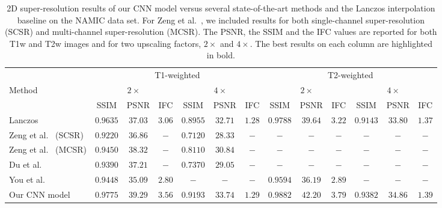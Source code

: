 \documentclass{ieeeaccess}
\begin{document}
\begin{table*}[!t]
\caption{2D super-resolution results of our CNN model versus several state-of-the-art methods \cite{Du-AS-2019,You-TMI-2019,ZENG-CBM-2018} and the Lanczos interpolation baseline on the NAMIC data set. For Zeng et al.~\cite{ZENG-CBM-2018}, we included results for both single-channel super-resolution (SCSR) and multi-channel super-resolution (MCSR). The PSNR, the SSIM and the IFC values are reported for both T1w and T2w images and for two upscaling factors, $2\times$ and $4\times$. The best results on each column are highlighted in bold.}\label{tab_namic_results_2D}
\begin{center}
\begin{tabular}{|l|c|c|c|c|c|c|c|c|c|c|c|c|}
\hline 
  & \multicolumn{6}{|c|}{T1-weighted} & \multicolumn{6}{|c|}{T2-weighted}\\
\cline{2-13}
Method        							& \multicolumn{3}{|c|}{$2\times$} & \multicolumn{3}{|c|}{$4\times$} & \multicolumn{3}{|c|}{$2\times$} & \multicolumn{3}{|c|}{$4\times$}\\
\cline{2-13}   												& SSIM         & PSNR      & IFC			& SSIM        & PSNR & IFC    & SSIM           & PSNR & IFC          & SSIM           & PSNR & IFC\\
\hline  
\hline   
Lanczos														& $0.9635$ & $37.03$ & $3.06$ & $0.8955$ & $32.71$  & $1.28$ & $0.9788$ & $39.64$ & $3.22$ & $0.9143$ & $33.80$ & $1.37$\\
\hline
Zeng et al.~\cite{ZENG-CBM-2018} (SCSR)	& $0.9220$ & $36.86$ & $-$ & $0.7120$ & $28.33$ & $-$ & $-$  & $-$ & $-$  & $-$ & $-$  & $-$\\  
\hline 
Zeng et al.~\cite{ZENG-CBM-2018} (MCSR)	& $0.9450$ & $38.32$ & $-$ & $0.8110$ & $30.84$ & $-$ & $-$  & $-$ & $-$  & $-$ & $-$  & $-$\\  
\hline 
Du et al.~\cite{Du-AS-2019}						& $0.9390$ & $37.21$ & $-$ & $0.7370$ & $29.05$ & $-$ & $-$  & $-$ & $-$  & $-$ & $-$  & $-$\\
\hline
You et al.~\cite{You-TMI-2019}  				& $0.9448$  & $35.09$ & $2.80$  		& $-$ & $-$  & $-$    	& $0.9594$  & $36.19$ & $2.89$  & $-$  & $-$ & $-$\\
\hline 
Our CNN model            & $\mathbf{0.9775}$ & $\mathbf{39.29}$ & $\mathbf{3.56}$	& $\mathbf{0.9193}$ & $\mathbf{33.74}$ & $\mathbf{1.29}$ & $\mathbf{0.9882}$ & $\mathbf{42.20}$ & $\mathbf{3.79}$ & $\mathbf{0.9382}$ & $\mathbf{34.86}$ & $\mathbf{1.39}$\\ 
\hline 
\end{tabular}
\end{center}
\end{table*}
\end{document}

